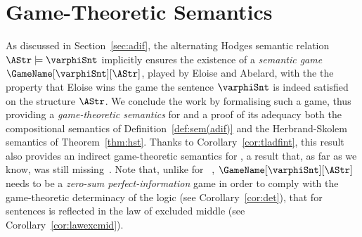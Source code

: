\documentclass[authoryear]{elsarticle}
\begin{document}

\section{Game-Theoretic Semantics}
\label{sec:gamthrsem}

As discussed in Section~\ref{sec:adif}, the alternating Hodges semantic relation
$\AStr \models \varphiSnt$ implicitly ensures the existence of a \emph{semantic
game} $\GameName[\varphiSnt][\AStr]$, played by Eloise and Abelard, with the the
property that Eloise wins the game \iff the \ADIF sentence $\varphiSnt$ is
indeed satisfied on the structure $\AStr$.
We conclude the work by formalising such a game, thus providing a
\emph{game-theoretic semantics} for \ADIF and a proof of its adequacy \wrt both
the compositional semantics of Definition~\ref{def:sem(adif)} and the
Herbrand-Skolem semantics of Theorem~\ref{thm:hst}.
Thanks to Corollary~\ref{cor:tladfint}, this result also provides an indirect
game-theoretic semantics for \TL, a result that, as far as we know, was still
missing~\citep{Vaa07}.
Note that, unlike for \DIF~\citep{HS97,MSS11}, $\GameName[\varphiSnt][\AStr]$
needs to be a \emph{zero-sum perfect-information} game in order to comply with
the game-theoretic determinacy of the logic (see Corollary~\ref{cor:det}), that
for sentences is reflected in the law of excluded middle (see
Corollary~\ref{cor:lawexcmid}).
\end{document}
